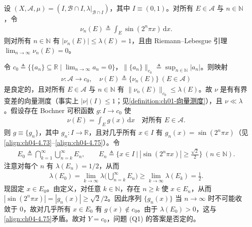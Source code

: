 \documentclass[../../main.tex]{subfiles}%
\begin{document}
\begin{example}\label{example:ch04-c0反例}
设 $(X,\mathcal{A},\mu)=(I,\mathcal{B}\cap I,\lambda|_{\mathcal{B}\cap I})$，其中 $I\equiv(0,1)$。对所有 $E\in\mathcal{A}$ 与 $n\in\mathbb{N}$，令
\begin{align}
\nu_n(E)\triangleq \int_E\sin(2^n\pi x)\,\mathrm{d}x. \label{align:ch04-4.73}
\end{align}
则对所有 $n\in\mathbb{N}$ 有 $|\nu_n(E)|\leqslant\lambda(E)=1$，且由 Riemann--Lebesgue 引理 $\lim_{n\to\infty}\nu_n(E)=0$。

令 $c_0\triangleq \{\{a_n\}\subseteq\mathbb{R}\mid\lim_{n\to\infty}a_n=0\}$，$\|\{a_n\}\|_{c_0}\triangleq \sup_{n\in\mathbb{N}}|a_n|$。则映射
\begin{align}
\nu:\mathcal{A}\to c_0,\quad \nu(E)\triangleq \{\nu_n(E)\}\ (E\in\mathcal{A}) \label{align:ch04-4.74}
\end{align}
是良定的，且对所有 $E\in\mathcal{A}$ 与 $n\in\mathbb{N}$ 有 $\|\nu_n(E)\|_{c_0}\leqslant\lambda(E)$。故 $\nu$ 是有有界变差的向量测度（事实上 $|\nu|(I)\leqslant1$；见\cref{definition:ch01-向量测度}），且 $\nu\ll\lambda$。假设存在 Bochner 可积函数 $g:I\to c_0$ 使
\begin{align}
\nu(E)=\int_E g(x)\,\mathrm{d}x\quad\text{对所有 }E\in\mathcal{A}. \label{align:ch04-4.75}
\end{align}
则 $g\equiv\{g_n\}$，其中 $g_n:I\to\mathbb{R}$，且对几乎所有 $x\in I$ 有 $g_n(x)=\sin(2^n\pi x)$（见\eqref{align:ch04-4.73}--\eqref{align:ch04-4.75}）。令
\begin{align*}
E_0\triangleq \bigcap_{k=1}^\infty\bigcup_{n=k}^\infty E_n,\qquad E_n\triangleq \Big\{x\in I\ \Big|\ |\sin(2^n\pi x)|\geqslant\frac{\sqrt2}{2}\Big\}\ (n\in\mathbb{N}).
\end{align*}
注意对每个 $n$ 有 $\lambda(E_n)=1/2$，从而
\begin{align*}
\lambda(E_0)=\lim_{k\to\infty}\lambda\Big(\bigcup_{n=k}^\infty E_n\Big)\geqslant\lim_{k\to\infty}\lambda(E_k)=\frac12.
\end{align*}
现固定 $x\in E_0$。由定义，对任意 $k\in\mathbb{N}$，存在 $n\geqslant k$ 使 $x\in E_n$，从而 $|\sin(2^n\pi x)|=|g_n(x)|\geqslant\sqrt2/2$。因此序列 $\{g_n(x)\}$ 当 $n\to\infty$ 时不可能收敛于 $0$，故对几乎所有 $x\in E_0$ 有 $g(x)\notin c_0$。由于 $\lambda(E_0)>0$，这与\eqref{align:ch04-4.75}矛盾。故对 $Y=c_0$，问题 (Q1) 的答案是否定的。
\end{example}
\end{document}
